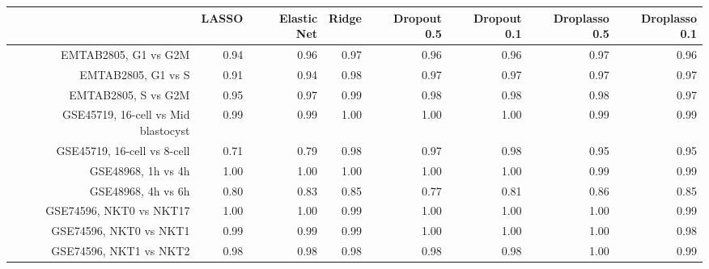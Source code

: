 \begin{table}[ht]
\centering
\begin{tabular}{rrrrrrrr}
  \hline
 & LASSO & Elastic Net & Ridge & Dropout 0.5 & Dropout 0.1 & Droplasso 0.5 & Droplasso 0.1 \\ 
  \hline
EMTAB2805, G1 vs G2M & 0.94 & 0.96 & 0.97 & 0.96 & 0.96 & 0.97 & 0.96 \\ 
  EMTAB2805, G1 vs S & 0.91 & 0.94 & 0.98 & 0.97 & 0.97 & 0.97 & 0.97 \\ 
  EMTAB2805, S vs G2M & 0.95 & 0.97 & 0.99 & 0.98 & 0.98 & 0.98 & 0.97 \\ 
  GSE45719, 16-cell vs Mid blastocyst & 0.99 & 0.99 & 1.00 & 1.00 & 1.00 & 0.99 & 0.99 \\ 
  GSE45719, 16-cell vs 8-cell & 0.71 & 0.79 & 0.98 & 0.97 & 0.98 & 0.95 & 0.95 \\ 
  GSE48968, 1h vs 4h & 1.00 & 1.00 & 1.00 & 1.00 & 1.00 & 0.99 & 0.99 \\ 
  GSE48968, 4h vs 6h & 0.80 & 0.83 & 0.85 & 0.77 & 0.81 & 0.86 & 0.85 \\ 
  GSE74596, NKT0 vs NKT17 & 1.00 & 1.00 & 0.99 & 1.00 & 1.00 & 1.00 & 0.99 \\ 
  GSE74596, NKT0 vs NKT1 & 0.99 & 0.99 & 0.99 & 1.00 & 1.00 & 1.00 & 0.98 \\ 
  GSE74596, NKT1 vs NKT2 & 0.98 & 0.98 & 0.98 & 0.98 & 0.98 & 1.00 & 0.99 \\ 
   \hline
\end{tabular}
\end{table}
